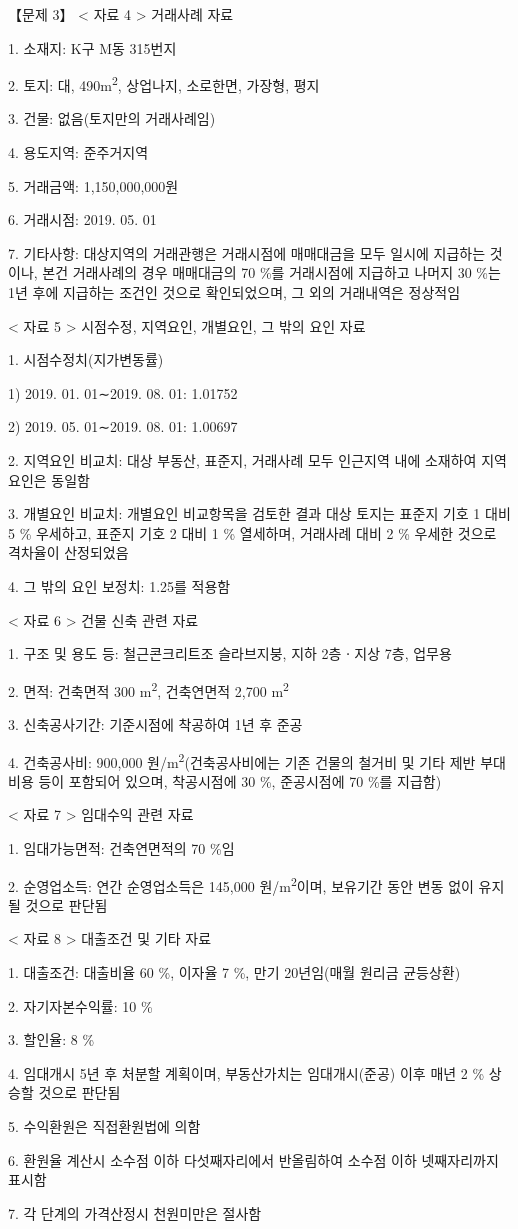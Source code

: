 \begin{longquestion}{【문제 3】}
< 자료 4 > 거래사례 자료 \par
1. 소재지: K구 M동 315번지 \par
2. 토지: 대, 490m\textsuperscript{2}, 상업나지, 소로한면, 가장형, 평지 \par
3. 건물: 없음(토지만의 거래사례임) \par
4. 용도지역: 준주거지역 \par
5. 거래금액: 1,150,000,000원 \par
6. 거래시점: 2019. 05. 01 \par
7. 기타사항: 대상지역의 거래관행은 거래시점에 매매대금을 모두 일시에 지급하는 것이나, 본건 거래사례의 경우 매매대금의 70 \%를 거래시점에 지급하고 나머지 30 \%는 1년 후에 지급하는 조건인 것으로 확인되었으며, 그 외의 거래내역은 정상적임 \par
< 자료 5 > 시점수정, 지역요인, 개별요인, 그 밖의 요인 자료 \par
1. 시점수정치(지가변동률) \par
1) 2019. 01. 01∼2019. 08. 01: 1.01752 \par
2) 2019. 05. 01∼2019. 08. 01: 1.00697 \par
2. 지역요인 비교치: 대상 부동산, 표준지, 거래사례 모두 인근지역 내에 소재하여 지역요인은 동일함 \par
3. 개별요인 비교치: 개별요인 비교항목을 검토한 결과 대상 토지는 표준지 기호 1 대비 5 \% 우세하고, 표준지 기호 2 대비 1 \% 열세하며, 거래사례 대비 2 \% 우세한 것으로 격차율이 산정되었음 \par
4. 그 밖의 요인 보정치: 1.25를 적용함 \par
< 자료 6 > 건물 신축 관련 자료 \par
1. 구조 및 용도 등: 철근콘크리트조 슬라브지붕, 지하 2층ㆍ지상 7층, 업무용 \par
2. 면적: 건축면적 300 m\textsuperscript{2}, 건축연면적 2,700 m\textsuperscript{2} \par
3. 신축공사기간: 기준시점에 착공하여 1년 후 준공 \par
4. 건축공사비: 900,000 원/m\textsuperscript{2}(건축공사비에는 기존 건물의 철거비 및 기타 제반 부대비용 등이 포함되어 있으며, 착공시점에 30 \%, 준공시점에 70 \%를 지급함) \par
< 자료 7 > 임대수익 관련 자료 \par
1. 임대가능면적: 건축연면적의 70 \%임 \par
2. 순영업소득: 연간 순영업소득은 145,000 원/m\textsuperscript{2}이며, 보유기간 동안 변동 없이 유지될 것으로 판단됨 \par
< 자료 8 > 대출조건 및 기타 자료 \par
1. 대출조건: 대출비율 60 \%, 이자율 7 \%, 만기 20년임(매월 원리금 균등상환) \par
2. 자기자본수익률: 10 \% \par
3. 할인율: 8 \% \par
4. 임대개시 5년 후 처분할 계획이며, 부동산가치는 임대개시(준공) 이후 매년 2 \% 상승할 것으로 판단됨 \par
5. 수익환원은 직접환원법에 의함 \par
6. 환원율 계산시 소수점 이하 다섯째자리에서 반올림하여 소수점 이하 넷째자리까지 표시함 \par
7. 각 단계의 가격산정시 천원미만은 절사함 \par
\end{longquestion}
